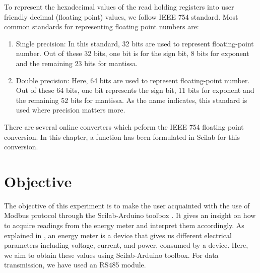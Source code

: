 

To represent the hexadecimal values of the read holding
registers into user friendly decimal (floating point) values, we
follow IEEE 754 standard. Most common standards for representing
floating point numbers are:
\begin{enumerate}
  \item Single precision: In this standard, 32 bits are used to represent floating-point number.
        Out of these 32 bits, one bit is for the sign bit, 8 bits for exponent and the remaining
        23 bits for mantissa.
  \item Double precision: Here, 64 bits are used to represent floating-point number.
        Out of these 64 bits, one bit represents the sign bit, 11 bits for exponent and the 
        remaining 52 bits for mantissa. As the name indicates, this standard is used where precision matters more.
\end{enumerate}
There are several online converters \cite{ieee-754-conv} which peform the
IEEE 754 floating point conversion. In this chapter, a function has been formulated in
Scilab for this conversion.   


\section{Objective}
The objective of this experiment is to make the user acquainted with
the use of Modbus protocol through the Scilab-Arduino toolbox \cite{modbus-paper}. 
It gives an insight on how to acquire readings from the energy meter and 
interpret them accordingly. As explained in , 
an energy meter is a device that gives us different electrical parameters including voltage, current,
and power, consumed by a device. Here, we aim to obtain these values
using Scilab-Arduino toolbox. For data transmission, we have used an
RS485 module.

